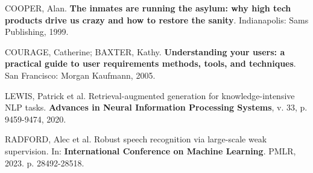 \documentclass[12pt,a4paper]{article}
\begin{document}
\vspace{0.2cm}
\noindent COOPER, Alan. \textbf{The inmates are running the asylum: why high tech products drive us crazy and how to restore the sanity}. Indianapolis: Sams Publishing, 1999.

\vspace{0.2cm}
\noindent COURAGE, Catherine; BAXTER, Kathy. \textbf{Understanding your users: a practical guide to user requirements methods, tools, and techniques}. San Francisco: Morgan Kaufmann, 2005.

\vspace{0.2cm}
\noindent LEWIS, Patrick et al. Retrieval-augmented generation for knowledge-intensive NLP tasks. \textbf{Advances in Neural Information Processing Systems}, v. 33, p. 9459-9474, 2020.

\vspace{0.2cm}
\noindent RADFORD, Alec et al. Robust speech recognition via large-scale weak supervision. In: \textbf{International Conference on Machine Learning}. PMLR, 2023. p. 28492-28518.
\end{document}
